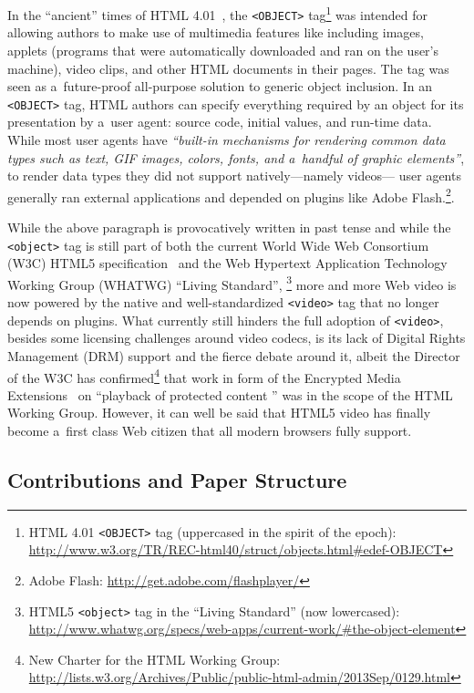 \documentclass{sig-alternate-ceur}
\newcommand{\inlinelistingsize}{\fontsize{8pt}{11pt}}
\let\oldurl\url
\renewcommand{\url}[1]{\inlinelistingsize\oldurl{#1}}
\begin{document}
In the ``ancient'' times of HTML 4.01~\cite{raggett1999html401},
the \texttt{<OBJECT>} tag\footnote{HTML 4.01 \texttt{<OBJECT>} tag
(uppercased in the spirit of the epoch):
\url{http://www.w3.org/TR/REC-html40/struct/objects.html\#edef-OBJECT}}
was intended for allowing authors to make use of multimedia features
like including images, applets (programs that were automatically downloaded
and ran on the user's machine), video clips, and other HTML documents in their pages.
The tag was seen as a~future-proof all-purpose solution to generic object inclusion.
In an \texttt{<OBJECT>} tag, HTML authors can specify everything required
by an object for its presentation by a~user agent:
source code, initial values, and run-time data.
While most user agents have \textit{``built-in mechanisms
for rendering common data types such as text, GIF images,
colors, fonts, and a~handful of graphic elements''},
to render data types they did not support natively---namely videos---%
user agents generally ran external applications and depended on plugins
like Adobe Flash.\footnote{Adobe Flash:
\url{http://get.adobe.com/flashplayer/}}.

While the above paragraph is provocatively written in past tense
and while the \texttt{<object>} tag is still part of both the current
World Wide Web Consortium (W3C) HTML5 specification~\cite{berjon2013html5}
and the Web Hypertext Application Technology Working Group
(WHATWG) ``Living Standard'',%
\footnote{HTML5 \texttt{<object>} tag in the ``Living Standard'' (now lowercased):
\url{http://www.whatwg.org/specs/web-apps/current-work/\#the-object-element}} 
more and more Web video is now powered by the native and well-standardized
\texttt{<video>} tag that no longer depends on plugins.
What currently still hinders the full adoption of \texttt{<video>},
besides some licensing challenges around video codecs,
is its lack of Digital Rights Management (DRM) support
and the fierce debate around it, albeit the Director of the W3C
has confirmed\footnote{New Charter for the HTML Working Group:
\url{http://lists.w3.org/Archives/Public/public-html-admin/2013Sep/0129.html}}
that work in form of the Encrypted Media Extensions~\cite{dorwin2013eme}
on ``playback of protected content '' was in the scope of the HTML Working Group.
However, it can well be said that
HTML5 video has finally become a~first class Web citizen
that all modern browsers fully support.

\subsection{Contributions and Paper Structure}
\end{document}
